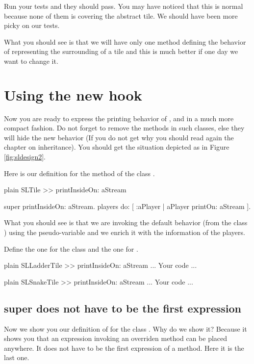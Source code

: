 \documentclass[10pt,twoside,english]{_support/latex/sbabook/sbabook}
\begin{document}
Run your tests and they should pass. You may have noticed that this is normal because none of them is covering the abstract tile. We should have been more picky on our tests. 

What you should see is that we will have only one method defining the behavior of representing the surrounding of a tile and this is much better if one day we want to change it.
\section{Using the new hook}
Now you are ready to express the printing behavior of ,  and  in a much more compact fashion. Do not forget to remove the  methods in such classes, else they will hide the new behavior (If you do not get why you should read again the chapter on inheritance). You should get the situation depicted as in Figure \ref{fig:sldesign2}.

Here is our definition for the  method of the class . 

\begin{displaycode}{plain}
SLTile >> printInsideOn: aStream

	super printInsideOn: aStream.
	players do: [ :aPlayer | aPlayer printOn: aStream ].
\end{displaycode}

What you should see is that we are invoking the default behavior (from the class ) using the  pseudo-variable and we enrich it with the information of the players.

Define the one for the  class and the one for .

\begin{displaycode}{plain}
SLLadderTile >> printInsideOn: aStream
	... Your code ...
\end{displaycode}

\begin{displaycode}{plain}
SLSnakeTile >> printInsideOn: aStream
	... Your code ...
\end{displaycode}
\subsection{super does not have to be the first expression}
Now we show you our definition of  for the class . Why do we show it? Because it shows you that an expression invoking an overriden method can be placed anywhere. It does not have to be the first expression of a method. Here it is the last one. 
\end{document}
